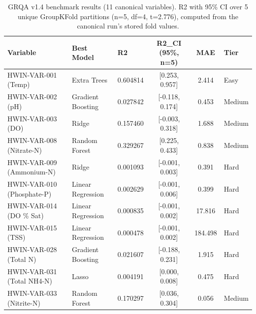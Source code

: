 \begin{table}
\caption{GRQA v1.4 benchmark results (11 canonical variables). R2 with 95\% CI over 5 unique GroupKFold partitions (n=5, df=4, t=2.776), computed from the canonical run's stored fold values.}
\label{tab:grqa}
\begin{tabular}{lllcc}
\toprule
Variable & Best Model & R2 & R2\_CI (95\%, n=5) & MAE & Tier \\
\midrule
HWIN-VAR-001 (Temp) & Extra Trees & 0.604814 & [0.253, 0.957] & 2.414 & Easy \\
HWIN-VAR-002 (pH) & Gradient Boosting & 0.027842 & [-0.118, 0.174] & 0.453 & Medium \\
HWIN-VAR-003 (DO) & Ridge & 0.157460 & [-0.003, 0.318] & 1.688 & Medium \\
HWIN-VAR-008 (Nitrate-N) & Random Forest & 0.329267 & [0.225, 0.433] & 0.838 & Medium \\
HWIN-VAR-009 (Ammonium-N) & Ridge & 0.001093 & [-0.001, 0.003] & 0.391 & Hard \\
HWIN-VAR-010 (Phosphate-P) & Linear Regression & 0.002629 & [-0.001, 0.006] & 0.399 & Hard \\
HWIN-VAR-014 (DO \% Sat) & Linear Regression & 0.000835 & [-0.001, 0.002] & 17.816 & Hard \\
HWIN-VAR-015 (TSS) & Linear Regression & 0.000478 & [-0.001, 0.002] & 184.498 & Hard \\
HWIN-VAR-028 (Total N) & Gradient Boosting & 0.021607 & [-0.188, 0.231] & 1.915 & Hard \\
HWIN-VAR-031 (Total NH4-N) & Lasso & 0.004191 & [0.000, 0.008] & 0.475 & Hard \\
HWIN-VAR-033 (Nitrite-N) & Random Forest & 0.170297 & [0.036, 0.304] & 0.056 & Medium \\
\bottomrule
\end{tabular}
\end{table}
